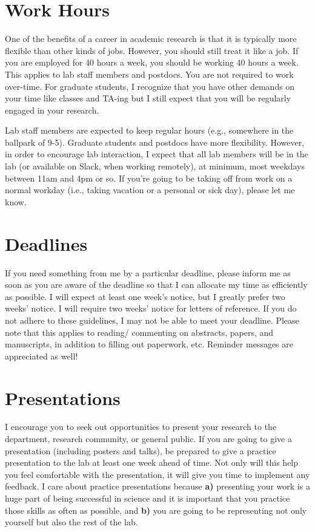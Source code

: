 \documentclass[
]{book}
\begin{document}
\hypertarget{work-hours}{%
\section{Work Hours}\label{work-hours}}

One of the benefits of a career in academic research is that it is typically more flexible than other kinds of jobs. However, you should still treat it like a job. If you are employed for 40 hours a week, you should be working 40 hours a week. This applies to lab staff members and postdocs. You are not required to work over-time. For graduate students, I recognize that you have other demands on your time like classes and TA-ing but I still expect that you will be regularly engaged in your research.

Lab staff members are expected to keep regular hours (e.g., somewhere in the ballpark of 9-5). Graduate students and postdocs have more flexibility. However, in order to encourage lab interaction, I expect that all lab members will be in the lab (or available on Slack, when working remotely), at minimum, most weekdays between 11am and 4pm or so. If you're going to be taking off from work on a normal workday (i.e., taking vacation or a personal or sick day), please let me know.

\hypertarget{deadlines}{%
\section{Deadlines}\label{deadlines}}

If you need something from me by a particular deadline, please inform me as soon as you are aware of the deadline so that I can allocate my time as efficiently as possible. I will expect at least one week's notice, but I greatly prefer two weeks' notice. I will require two weeks' notice for letters of reference. If you do not adhere to these guidelines, I may not be able to meet your deadline. Please note that this applies to reading/ commenting on abstracts, papers, and manuscripts, in addition to filling out paperwork, etc. Reminder messages are appreciated as well!

\hypertarget{presentations}{%
\section{Presentations}\label{presentations}}

I encourage you to seek out opportunities to present your research to the department, research community, or general public. If you are going to give a presentation (including posters and talks), be prepared to give a practice presentation to the lab at least one week ahead of time. Not only will this help you feel comfortable with the presentation, it will give you time to implement any feedback. I care about practice presentations because \textbf{a)} presenting your work is a huge part of being successful in science and it is important that you practice those skills as often as possible, and \textbf{b)} you are going to be representing not only yourself but also the rest of the lab.
\end{document}
